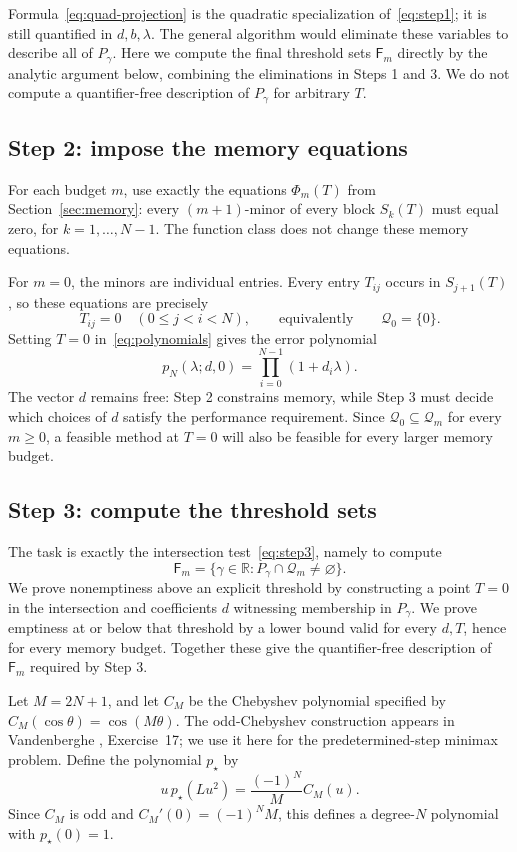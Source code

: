 \documentclass[11pt]{article}
\numberwithin{equation}{section}
\theoremstyle{definition}
\newcommand{\R}{\mathbb R}
\newcommand{\Q}{\mathcal Q}
\begin{document}
Formula~\eqref{eq:quad-projection} is the quadratic specialization of~\eqref{eq:step1}; it is still quantified in $d,b,\lambda$. The general algorithm would eliminate these variables to describe all of $P_\gamma$. Here we compute the final threshold sets $\mathsf F_m$ directly by the analytic argument below, combining the eliminations in Steps 1 and 3. We do not compute a quantifier-free description of $P_\gamma$ for arbitrary $T$.

\subsection{Step 2: impose the memory equations}
For each budget $m$, use exactly the equations $\Phi_m(T)$ from Section~\ref{sec:memory}: every $(m+1)$-minor of every block $S_k(T)$ must equal zero, for $k=1,\ldots,N-1$. The function class does not change these memory equations.

For $m=0$, the minors are individual entries. Every entry $T_{ij}$ occurs in $S_{j+1}(T)$, so these equations are precisely
\[
 T_{ij}=0\quad(0\le j<i<N),\qquad\text{equivalently}\qquad\Q_0=\{0\}.
\]
Setting $T=0$ in~\eqref{eq:polynomials} gives the error polynomial
\begin{equation}
 p_N(\lambda;d,0)=\prod_{i=0}^{N-1}(1+d_i\lambda).
 \label{eq:product}
\end{equation}
The vector $d$ remains free: Step 2 constrains memory, while Step 3 must decide which choices of $d$ satisfy the performance requirement. Since $\Q_0\subseteq\Q_m$ for every $m\ge0$, a feasible method at $T=0$ will also be feasible for every larger memory budget.

\subsection{Step 3: compute the threshold sets}
The task is exactly the intersection test~\eqref{eq:step3}, namely to compute
\[
 \mathsf F_m=\{\gamma\in\R:P_\gamma\cap\Q_m\ne\varnothing\}.
\]
We prove nonemptiness above an explicit threshold by constructing a point $T=0$ in the intersection and coefficients $d$ witnessing membership in $P_\gamma$. We prove emptiness at or below that threshold by a lower bound valid for every $d,T$, hence for every memory budget. Together these give the quantifier-free description of $\mathsf F_m$ required by Step 3.

Let $M=2N+1$, and let $C_M$ be the Chebyshev polynomial specified by
$C_M(\cos\theta)=\cos(M\theta)$. The odd-Chebyshev construction appears in Vandenberghe \cite{Vandenberghe22}, Exercise~17; we use it here for the predetermined-step minimax problem. Define the polynomial $p_\star$ by
\begin{equation}
 u\,p_\star(Lu^2)=\frac{(-1)^N}{M}C_M(u).
 \label{eq:Cheb}
\end{equation}
Since $C_M$ is odd and $C_M'(0)=(-1)^NM$, this defines a degree-$N$ polynomial with $p_\star(0)=1$.
\end{document}
